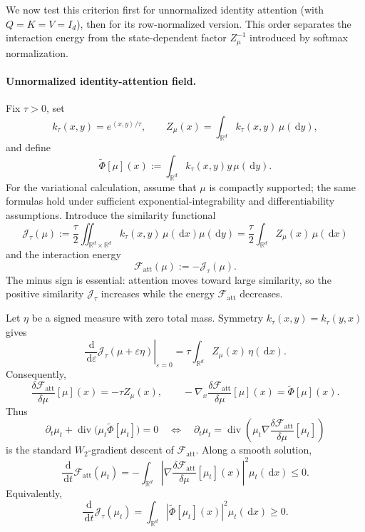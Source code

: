 \documentclass[11pt]{amsart}
\numberwithin{equation}{section}
\theoremstyle{plain}
\newcommand{\R}{\mathbb{R}}
\newcommand{\dd}{\,\mathrm{d}}
\newcommand{\ip}[2]{\left\langle#1,#2\right\rangle}
\DeclareMathOperator{\diver}{div}
\begin{document}
We now test this criterion first for unnormalized identity attention (with $Q=K=V=I_d$), then for
its row-normalized version.  This order separates the interaction energy from
the state-dependent factor $Z_\mu^{-1}$ introduced by softmax
normalization.

\paragraph{\textbf{Unnormalized identity-attention field.}}
Fix $\tau>0$, set
\[
 k_\tau(x,y)=e^{\ip{x}{y}/\tau},
 \qquad
 Z_\mu(x)=\int_{\R^d}k_\tau(x,y)\,\mu(\dd y),
\]
and define
\begin{equation}\label{eq:unnormalized-identity-attention-field}
 \widetilde\Phi[\mu](x)
 :=\int_{\R^d}k_\tau(x,y)y\,\mu(\dd y).
\end{equation}
For the variational calculation, assume that $\mu$ is compactly supported;
the same formulas hold under sufficient exponential-integrability and
differentiability assumptions.  Introduce the similarity functional
\begin{equation}\label{eq:identity-attention-energy}
 \mathcal J_\tau(\mu)
 :=\frac{\tau}{2}\iint_{\R^d\times\R^d}
 k_\tau(x,y)\,\mu(\dd x)\mu(\dd y)
 =\frac{\tau}{2}\int_{\R^d}Z_\mu(x)\,\mu(\dd x)
\end{equation}
and the interaction energy
\begin{equation}\label{eq:attention-free-energy}
 \mathcal F_{\mathrm{att}}(\mu):=-\mathcal J_\tau(\mu).
\end{equation}
The minus sign is essential: attention moves toward large similarity, so the
positive similarity $\mathcal J_\tau$ increases while the energy
$\mathcal F_{\mathrm{att}}$ decreases.

Let $\eta$ be a signed measure with zero total mass.  Symmetry
$k_\tau(x,y)=k_\tau(y,x)$ gives
\[
 \left.\frac{\dd}{\dd\varepsilon}
 \mathcal J_\tau(\mu+\varepsilon\eta)\right|_{\varepsilon=0}
 =\tau\int_{\R^d}Z_\mu(x)\,\eta(\dd x).
\]
Consequently,
\begin{equation}\label{eq:identity-attention-first-variation}
 \frac{\delta\mathcal F_{\mathrm{att}}}{\delta\mu}[\mu](x)
 =-\tau Z_\mu(x),
 \qquad
 -\nabla_x\frac{\delta\mathcal F_{\mathrm{att}}}{\delta\mu}[\mu](x)
 =\widetilde\Phi[\mu](x).
\end{equation}
Thus
\begin{equation}\label{eq:unnormalized-attention-gradient-flow}
 \partial_t\mu_t+\diver\bigl(\mu_t\widetilde\Phi[\mu_t]\bigr)=0
 \quad\Longleftrightarrow\quad
 \partial_t\mu_t
 =\diver\left(\mu_t\nabla
 \frac{\delta\mathcal F_{\mathrm{att}}}{\delta\mu}[\mu_t]\right)
\end{equation}
is the standard $W_2$-gradient descent of
$\mathcal F_{\mathrm{att}}$.  Along a smooth solution,
\[
 \frac{\dd}{\dd t}\mathcal F_{\mathrm{att}}(\mu_t)
 =-\int_{\R^d}\left|
 \nabla\frac{\delta\mathcal F_{\mathrm{att}}}{\delta\mu}[\mu_t](x)
 \right|^2\mu_t(\dd x)\leq0.
\]
Equivalently,
\begin{equation}\label{eq:identity-attention-energy-ascent}
 \frac{\dd}{\dd t}\mathcal J_\tau(\mu_t)
 =\int_{\R^d}\left|\widetilde\Phi[\mu_t](x)\right|^2
 \mu_t(\dd x)\geq0.
\end{equation}
\end{document}
